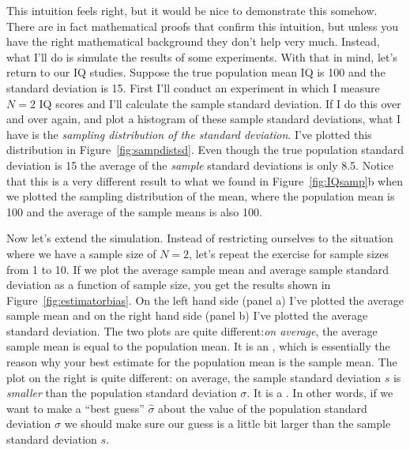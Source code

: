 This intuition feels right, but it would be nice to demonstrate this somehow. There are in fact mathematical proofs that confirm this intuition, but unless you have the right mathematical background they don't help very much. Instead, what I'll do is simulate the results of some experiments. With that in mind, let's return to our IQ studies. Suppose the true population mean IQ is 100 and the standard deviation is 15. First I'll conduct an experiment in which I measure $N=2$ IQ scores and I'll calculate the sample standard deviation. If I do this over and over again, and plot a histogram of these sample standard deviations, what I have is the {\it sampling distribution of the standard deviation}. I've plotted this distribution in Figure~\ref{fig:sampdistsd}. Even though the true population standard deviation is 15 the average of the {\it sample} standard deviations is only 8.5. Notice that this is a very different result to what we found in Figure~\ref{fig:IQsamp}b when we plotted the sampling distribution of the mean, where the population mean is 100 and the average of the sample means is also 100. 

Now let's extend the simulation. Instead of restricting ourselves to the situation where we have a sample size of $N=2$, let's repeat the exercise for sample sizes from 1 to 10. If we plot the average sample mean and average sample standard deviation as a function of sample size, you get the results shown in Figure~\ref{fig:estimatorbias}. On the left hand side (panel a) I've plotted the average sample mean and on the right hand side (panel b) I've plotted the average standard deviation. The two plots are quite different:{\it on average}, the average sample mean is equal to the population mean. It is an , which is essentially the reason why your best estimate for the population mean is the sample mean. The plot on the right is quite different: on average, the sample standard deviation $s$ is {\it smaller} than the population standard deviation $\sigma$. It is a . In other words, if we want to make a ``best guess'' $\hat\sigma$ about the value of the population standard deviation $\sigma$ we should make sure our guess is a little bit larger than the sample standard deviation $s$. 


